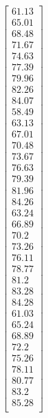 \begin{equation}
\left[
\begin{array}{c}
61.13 \\
65.01 \\
68.48 \\
71.67 \\
74.63 \\
77.39 \\
79.96 \\
82.26 \\
84.07 \\
58.49 \\
63.13 \\
67.01 \\
70.48 \\
73.67 \\
76.63 \\
79.39 \\
81.96 \\
84.26 \\
63.24 \\
66.89 \\
70.2 \\
73.26 \\
76.11 \\
78.77 \\
81.2 \\
83.28 \\
84.28 \\
61.03 \\
65.24 \\
68.89 \\
72.2 \\
75.26 \\
78.11 \\
80.77 \\
83.2 \\
85.28 \\
\end{array}
\right]
\end{equation}
